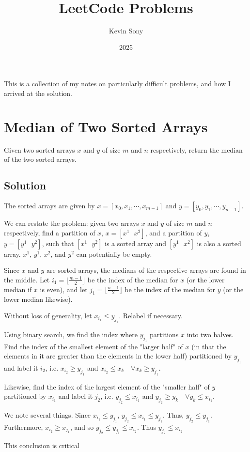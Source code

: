 \documentclass{article}
\title{LeetCode Problems}
\author{Kevin Sony}
\date{2025}
\newcommand{\floor}[1]{\lfloor #1 \rfloor}
\begin{document}
\maketitle

This is a collection of my notes on particularly difficult problems, and how I arrived at the solution.

\section*{Median of Two Sorted Arrays}

Given two sorted arrays $x$ and $y$ of size $m$ and $n$ respectively, return the median of the two sorted arrays.

\subsection*{Solution}

The sorted arrays are given by $x = [x_0, x_1, \cdots, x_{m - 1}]$ and $y = [y_0, y_1, \cdots, y_{n - 1}]$.

We can restate the problem: given two arrays $x$ and $y$ of size $m$ and $n$ respectively, find a partition of $x$, $x = [x^1\text{  }x^2]$, and a partition of $y$, $y = [y^1\text{  }y^2]$, such that  $[x^1\text{  }y^2]$ is a sorted array and $[y^1\text{  }x^2]$ is also a sorted array. $x^1$, $y^1$, $x^2$, and $y^2$ can potentially be empty.


Since $x$ and $y$ are sorted arrays, the medians of the respective arrays are found in the middle. Let $i_1 = \floor{\frac{m - 1}{2}}$ be the index of the median for $x$ (or the lower median if $x$ is even), and let $j_1 = \floor{\frac{n - 1}{2}}$ be the index of the median for $y$ (or the lower median likewise).

Without loss of generality, let $x_{i_1} \leq y_{j_1}$. Relabel if necessary.

Using binary search, we find the index where $y_{j_1}$ partitions $x$ into two halves. Find the index of the smallest element of the "larger half" of $x$ (in that the elements in it are greater than the elements in the lower half) partitioned by $y_{j_1}$ and label it $i_2$, i.e. $x_{i_2} \geq y_{j_1}$ and $x_{i_2} \leq x_k \quad \forall x_k \geq y_{j_1}$.

Likewise, find the index of the largest element of the "smaller half" of $y$ partitioned by $x_{i_1}$ and label it $j_2$, i.e. $y_{j_2} \leq x_{i_1}$ and $y_{j_2} \geq y_k \quad \forall y_k \leq x_{i_1}$.

We note several things. Since $x_{i_1} \leq y_{j_1}$, $y_{j_2} \leq x_{i_1} \leq y_{j_1}$. Thus, $y_{j_2} \leq y_{j_1}$. Furthermore, $x_{i_2} \geq x_{j_1}$, and so $y_{j_2} \leq y_{j_1} \leq x_{i_2}$. Thus $y_{j_2} \leq x_{i_2}$

This conclusion is critical
\end{document}
